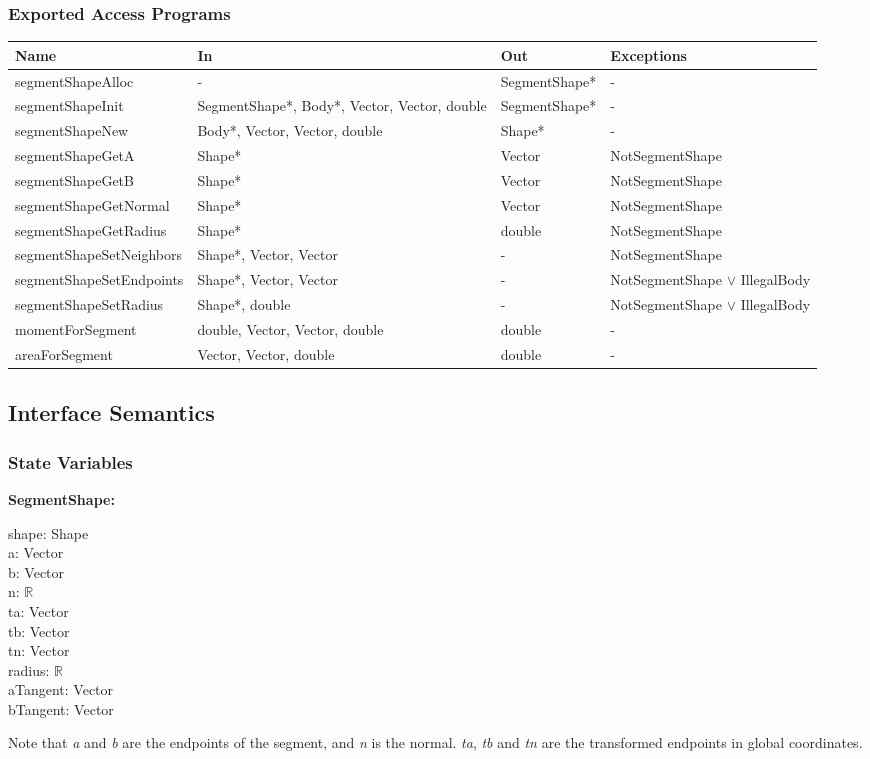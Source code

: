 \documentclass[12pt]{article}
\newcommand{\vor}{$\vee$ }
\newcommand{\R}{$\mathbb{R}$}
\begin{document}
\subsubsection{Exported Access Programs} \label{SecEAPSegment}
	\renewcommand*{\arraystretch}{1.2}
	\begin{longtable}{| y | x{3.5cm} | y | x{3.5cm} |}
	\hline \textbf{Name} & \textbf{In} & \textbf{Out} & \textbf{Exceptions} \\ \hline 
	segmentShapeAlloc & - & SegmentShape* & - \\ \hline
	segmentShapeInit & SegmentShape*, Body*, Vector, Vector, double & SegmentShape* & - \\ \hline
	segmentShapeNew & Body*, Vector, Vector, double & Shape* & - \\ \hline
	segmentShapeGetA & Shape* & Vector & NotSegmentShape \\ \hline
	segmentShapeGetB & Shape* & Vector & NotSegmentShape \\ \hline
	segmentShapeGetNormal & Shape* & Vector & NotSegmentShape \\ \hline
	segmentShapeGetRadius & Shape* & double & NotSegmentShape \\ \hline
	segmentShapeSetNeighbors & Shape*, Vector, Vector & - & NotSegmentShape \\ \hline
	segmentShapeSetEndpoints & Shape*, Vector, Vector & - & NotSegmentShape \vor IllegalBody \\ \hline
	segmentShapeSetRadius & Shape*, double & - & NotSegmentShape \vor IllegalBody \\ \hline
	momentForSegment & double, Vector, Vector, double & double & - \\ \hline
	areaForSegment & Vector, Vector, double & double & - \\ \hline
\end{longtable}

\subsection{Interface Semantics}

\subsubsection{State Variables} \label{SecSVSegment}
	\textbf{SegmentShape:}
	\begin{multicols}{2}
		\noindent shape: Shape \\
		a: Vector \\
		b: Vector \\
		n: \R \\
		ta: Vector \\
		tb: Vector \\
		tn: Vector \\
		radius: \R \\
		aTangent: Vector \\
		bTangent: Vector \\
	\end{multicols}
	\noindent Note that \textit{a} and \textit{b} are the endpoints of the segment, and \textit{n} is the normal. \textit{ta}, \textit{tb} and \textit{tn} are the transformed endpoints in global coordinates.
\end{document}
